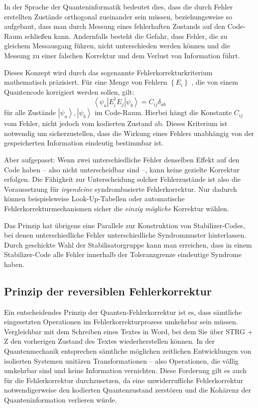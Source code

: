 In der Sprache der Quanteninformatik bedeutet dies, dass die durch Fehler erstellten Zustände orthogonal zueinander sein müssen, beziehungsweise so aufgebaut, dass man durch Messung eines fehlerhaften Zustands auf den Code-Raum schließen kann. Andernfalls besteht die Gefahr, dass Fehler, die zu gleichem Messausgang führen, nicht unterschieden werden können und die Messung zu einer falschen Korrektur und dem Verlust von Information führt. \cite[Seite 449–451]{nielsen_quantum_2010}

Dieses Konzept wird durch das sogenannte Fehlerkorrekturkriterium mathematisch präzisiert. Für eine Menge von Fehlern \(\left\{E_{i}\right\}\) , die von einem Quantencode korrigiert werden sollen, gilt:
\begin{equation}
    \left\langle\psi_{a}\right| E_{i}^{\dagger} E_{j}\left|\psi_{b}\right\rangle=C_{i j} \delta_{a b}
\end{equation}
für alle Zustände \(
    \left|\psi_{a}\right\rangle,\left|\psi_{b}\right\rangle
\)  im Code-Raum. Hierbei hängt die Konstante \(
    C_{i j}
\) vom Fehler,  nicht jedoch vom kodierten Zustand ab. Dieses Kriterium ist notwendig um sicherzustellen, dass die Wirkung eines Fehlers unabhängig von der gespeicherten Information eindeutig bestimmbar ist.

Aber aufgepasst: Wenn zwei unterschiedliche Fehler denselben Effekt auf den Code haben – also nicht unterscheidbar sind –, kann keine gezielte Korrektur erfolgen. Die Fähigkeit zur Unterscheidung solcher Fehlerzustände ist also die Voraussetzung für \textit{irgendeine} syndrombasierte Fehlerkorrektur. Nur dadurch können beispielsweise Look-Up-Tabellen oder automatische Fehlerkorrekturmechanismen sicher die \textit{einzig mögliche} Korrektur wählen.

Das Prinzip hat übrigens eine Parallele zur Konstruktion von Stabilizer-Codes, bei denen unterschiedliche Fehler unterschiedliche Syndrommuster hinterlassen. Durch geschickte Wahl der Stabilisatorgruppe kann man erreichen, dass in einem Stabilizer-Code alle Fehler innerhalb der Toleranzgrenze eindeutige Syndrome haben. \cite{gottesmann Stabilizer Codes}

\subsection{Prinzip der reversiblen Fehlerkorrektur}
Ein entscheidendes Prinzip der Quanten-Fehlerkorrektur ist es, dass sämtliche eingesetzten Operationen im Fehlerkorrekturprozess umkehrbar sein müssen. Vergleichbar mit dem Schreiben eines Textes in Word, bei dem Sie über STRG + Z den vorherigen Zustand des Textes wiederherstellen können.  In der Quantenmechanik entsprechen sämtliche möglichen zeitlichen Entwicklungen von isolierten Systemen unitären Transformationen – also Operationen, die völlig umkehrbar sind und keine Information vernichten. Diese Forderung gilt es auch für die Fehlerkorrektur durchzusetzen, da eine unwiderrufliche Fehlerkorrektur notwendigerweise den kodierten Quantenzustand zerstören und die Kohärenz der Quanteninformation verlieren würde. \cite[Seite 450-451]{nielsen_quantum_2010}

